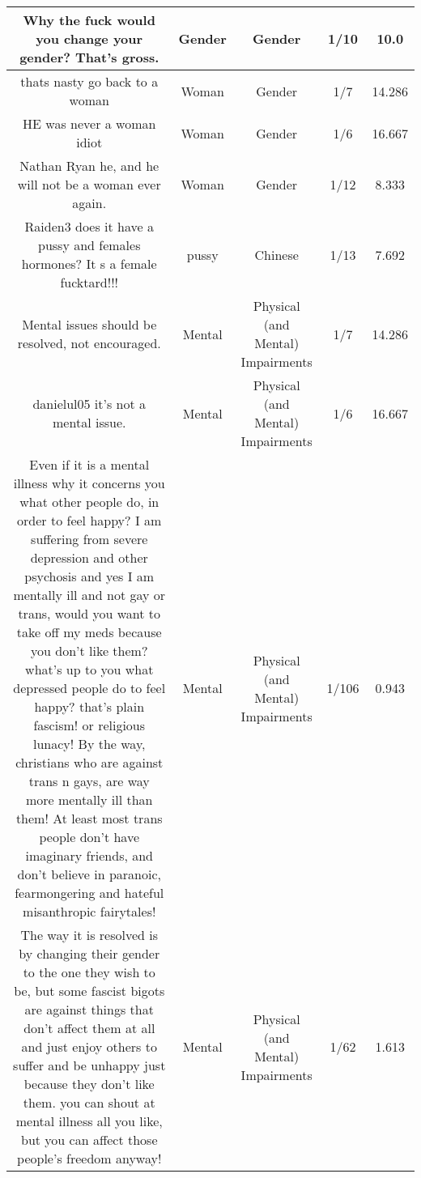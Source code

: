 \documentclass[11pt]{article}
\newlength\mylength
\begin{document}
\begin{center}
\begin{longtable}{|C{.40\mylength}|C{.30\mylength}|C{.15\mylength}|C{.15\mylength}|C{.15\mylength}|}
  Why the fuck would you change your gender? That's gross.  & Gender & Gender & 1/10 & 10.0 \\  \hline
  thats nasty go back to a woman  & Woman & Gender & 1/7 & 14.286 \\  \hline
  HE was never a woman idiot  & Woman & Gender & 1/6 & 16.667 \\  \hline
  Nathan Ryan he, and he will not be a woman ever again.  & Woman & Gender & 1/12 & 8.333 \\  \hline
   Raiden3 does it have a pussy and females hormones? It s a female fucktard!!!  & pussy & Chinese & 1/13 & 7.692 \\  \hline
  Mental issues should be resolved, not encouraged.  & Mental & Physical (and Mental) Impairments & 1/7 & 14.286 \\  \hline
  danielul05 it's not a mental issue.  & Mental & Physical (and Mental) Impairments & 1/6 & 16.667 \\  \hline
  Even if it is a mental illness why it concerns you what other people do, in order  to feel happy? I am suffering from severe depression and other psychosis and yes I am mentally ill and not gay or trans, would you want to take off my meds because you don't like them?  what's up to you what depressed people do to feel happy? that's plain fascism! or religious lunacy! By the way, christians who are against trans  n gays, are way more mentally ill than them! At least most trans people don't have imaginary friends, and don't believe in paranoic, fearmongering and hateful misanthropic fairytales!  & Mental & Physical (and Mental) Impairments & 1/106 & 0.943 \\  \hline
  The way it is resolved is by changing their gender to the one they wish to be, but some fascist bigots are against things that don't affect them at all and just enjoy others to suffer and  be unhappy just because they don't like them. you can shout at mental illness all you like, but you can affect those people's freedom anyway!  & Mental & Physical (and Mental) Impairments & 1/62 & 1.613 \\  \hline

\end{longtable}
\end{center}
\end{document}
